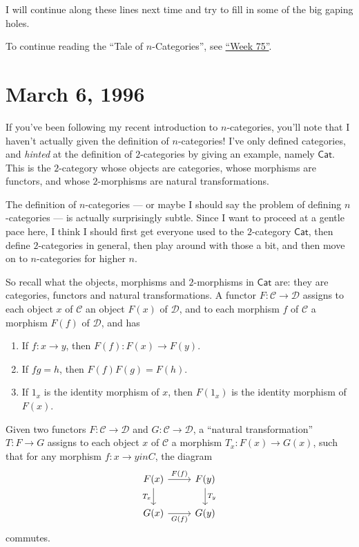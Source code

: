 \documentclass{article}
\def\tightlist{}
\begin{document}
I will continue along these lines next time and try to fill in some of
the big gaping holes.

To continue reading the ``Tale of \(n\)-Categories'', see
\protect\hyperlink{week75}{``Week 75''}.



\hypertarget{week75}{%
\section{March 6, 1996}\label{week75}}

If you've been following my recent introduction to \(n\)-categories,
you'll note that I haven't actually given the definition of
\(n\)-categories! I've only defined categories, and \emph{hinted} at the
definition of \(2\)-categories by giving an example, namely
\(\mathsf{Cat}\). This is the \(2\)-category whose objects are
categories, whose morphisms are functors, and whose \(2\)-morphisms are
natural transformations.

The definition of \(n\)-categories --- or maybe I should say the problem
of defining \(n\)-categories --- is actually surprisingly subtle. Since
I want to proceed at a gentle pace here, I think I should first get
everyone used to the \(2\)-category \(\mathsf{Cat}\), then define
\(2\)-categories in general, then play around with those a bit, and then
move on to \(n\)-categories for higher \(n\).

So recall what the objects, morphisms and \(2\)-morphisms in
\(\mathsf{Cat}\) are: they are categories, functors and natural
transformations. A functor \(F\colon \mathcal{C}\to\mathcal{D}\) assigns
to each object \(x\) of \(\mathcal{C}\) an object \(F(x)\) of
\(\mathcal{D}\), and to each morphism \(f\) of \(\mathcal{C}\) a
morphism \(F(f)\) of \(\mathcal{D}\), and has

\begin{enumerate}
\def\labelenumi{\arabic{enumi}.}
\tightlist
\item
  If \(f\colon x \to y\), then \(F(f)\colon F(x) \to F(y)\).
\item
  If \(fg = h\), then \(F(f)F(g) = F(h)\).
\item
  If \(1_x\) is the identity morphism of \(x\), then \(F(1_x)\) is the
  identity morphism of \(F(x)\).
\end{enumerate}

Given two functors \(F\colon\mathcal{C}\to\mathcal{D}\) and
\(G\colon\mathcal{C}\to\mathcal{D}\), a ``natural transformation''
\(T\colon F\to G\) assigns to each object \(x\) of \(\mathcal{C}\) a
morphism \(T_x\colon F(x)\to G(x)\), such that for any morphism
\(f\colon x\to y in C\), the diagram \[
  \begin{tikzcd}
    F(x) \rar["F(f)"] \dar[swap,"T_x"]
    & F(y) \dar["T_y"]
  \\G(x) \rar[swap,"G(f)"]
    & G(y)
  \end{tikzcd}
\] commutes.
\end{document}
